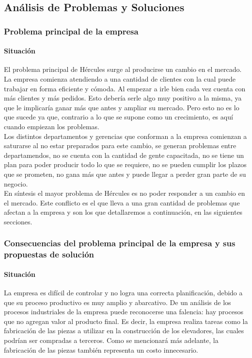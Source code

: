 \documentclass[12pt,a4paper,spanish]{article}
\begin{document}
\subsection{An\'alisis de Problemas y Soluciones}
\subsubsection{Problema principal de la empresa}
\paragraph{Situaci\'on}
El problema principal de H\'ercules surge al producirse un cambio en el mercado. La empresa comienza atendiendo a una cantidad de clientes con la cual puede trabajar en forma eficiente y c\'omoda. Al empezar a irle bien cada vez cuenta con m\'as clientes y m\'as pedidos. Esto deber\'ia serle algo muy positivo a la misma, ya que le implicar\'ia ganar m\'as que antes y ampliar su mercado. Pero esto no es lo que sucede ya que, contrario a lo que se supone como un crecimiento, es aqu\'i cuando empiezan los problemas.\\
Los distintos departamentos y gerencias que conforman a la empresa comienzan a saturarse al no estar preparados para este cambio, se generan problemas entre departamendos, no se cuenta con la cantidad de gente capacitada, no se tiene un plan para poder producir todo lo que se requiere, no se pueden cumplir los plazos que se prometen, no gana m\'as que antes y puede llegar a perder gran parte de su negocio.\\
En s\'intesis el mayor problema de H\'ercules es no poder responder a un cambio en el mercado. Este conflicto es el que lleva a una gran cantidad de problemas que afectan a la empresa y son los que detallaremos a continuaci\'on, en las siguientes secciones.

\subsubsection{Consecuencias del problema principal de la empresa y sus propuestas de soluci\'on}
\paragraph{Situaci\'on}
La empresa es dif\'icil de controlar y no logra una correcta planificaci\'on, debido a que su proceso productivo es muy amplio y abarcativo. De un an\'alisis de los procesos industriales de la empresa puede reconocerse una falencia: hay procesos que no agregan valor al producto final. Es decir, la empresa realiza tareas como la fabricaci\'on de las piezas a utilizar en la construcci\'on de los elevadores, las cuales podr\'ian ser compradas a terceros. Como se mencionar\'a m\'as adelante, la fabricaci\'on de las piezas tambi\'en representa un costo innecesario.
\end{document}
